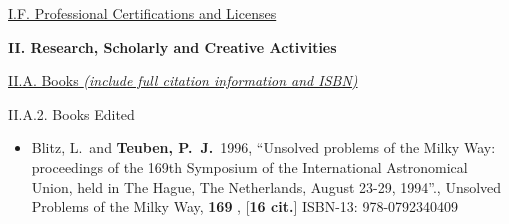 \documentclass[11pt,letterpaper]{article}
\begin{document}
\underline{I.F. Professional Certifications and Licenses}


\textbf{II. Research, Scholarly and Creative Activities}

% 

\noindent\underline{II.A. Books \textit{(include full citation information and ISBN)}}


II.A.2. Books Edited

\begin{itemize}


\item[] 
Blitz, L.~and {\bf Teuben, P.~J.}\  1996,  ``Unsolved problems of the Milky Way: 
proceedings of the 169th Symposium of the International Astronomical Union, 
held in The Hague, The Netherlands, August 23-29, 1994''., Unsolved Problems 
of the Milky Way,  {\bf 169} ,  [{\bf 16 cit.}] ISBN-13: 978-0792340409


\end{itemize}
\end{document}
